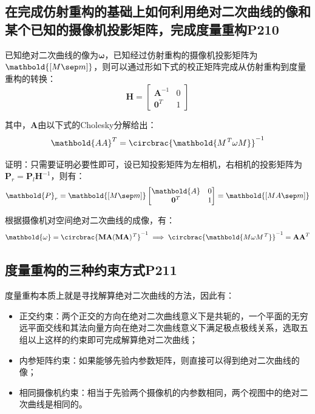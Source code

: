 \documentclass[11pt]{article}
\begin{document}
\subsection{在完成仿射重构的基础上如何利用绝对二次曲线的像和某个已知的摄像机投影矩阵，完成度量重构P210}
已知绝对二次曲线的像为$\mathbold{\omega}$，已知经过仿射重构的摄像机投影矩阵为$\mathbold{[M\sep m]}$，则可以通过形如下式的校正矩阵完成从仿射重构到度量重构的转换：
\begin{equation*}
  \mathbold{H}=\begin{bmatrix}
    \mathbold{A}^{-1} & 0 \\
    \mathbf{0}^T      & 1
  \end{bmatrix}
\end{equation*}\par
其中，$\mathbold{A}$由以下式的Cholesky分解给出：
\begin{equation*}
  \mathbold{AA}^T=\circbrac{\mathbold{M^\mathit{T}\omega M}}^{-1}
\end{equation*}\par
证明：只需要证明必要性即可，设已知投影矩阵为左相机，右相机的投影矩阵为$\mathbold{P}_r=\mathbold{P}_l\mathbold{H}^{-1}$，则有：
\begin{equation*}
  \mathbold{P}_r=\mathbold{[M\sep m]}\begin{bmatrix}
    \mathbold{A} & 0 \\
    \mathbf{0}^T & 1
  \end{bmatrix}= \mathbold{[MA\sep m]}
\end{equation*}\par
根据摄像机对空间绝对二次曲线的成像，有：
\begin{equation*}
  \mathbold{\omega}=\circbrac{\mathbf{MA(MA)^\mathit{T}}}^{-1}\implies\circbrac{\mathbold{M\omega M^\mathit{T}}}^{-1}=\mathbf{AA}^T
\end{equation*}\par
\subsection{	度量重构的三种约束方式P211}
度量重构本质上就是寻找解算绝对二次曲线的方法，因此有：
\begin{itemize}
  \item 正交约束：两个正交的方向在绝对二次曲线意义下是共轭的，一个平面的无穷远平面交线和其法向量方向在绝对二次曲线意义下满足极点极线关系，选取五组以上这样的约束即可完成解算绝对二次曲线；
  \item 内参矩阵约束：如果能够先验内参数矩阵，则直接可以得到绝对二次曲线的像；
  \item 相同摄像机约束：相当于先验两个摄像机的内参数相同，两个视图中的绝对二次曲线是相同的。
\end{itemize}
\end{document}
